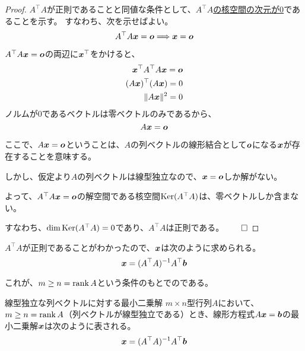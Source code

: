 \documentclass[../../../topic_linear-algebra]{subfiles}
\begin{document}
\begin{proof}
  $A^\top A$が正則であることと同値な条件として、\hyperref[thm:invertibility-by-kernel]{$A^\top A$の核空間の次元が0}であることを示す。
  すなわち、次を示せばよい。
  \begin{equation*}
    A^\top A \vb*{x} = \vb*{o} \Longrightarrow \vb*{x} = \vb*{o}
  \end{equation*}
  
  $A^\top A \vb*{x} = \vb*{o}$の両辺に$\vb*{x}^\top$をかけると、
  \begin{align*}
    \vb*{x}^\top A^\top A \vb*{x} = \vb*{o} \\
    (A \vb*{x})^\top (A \vb*{x}) = 0 \\
    \| A \vb*{x} \|^2 = 0
  \end{align*}
  ノルムが0であるベクトルは零ベクトルのみであるから、
  \begin{equation*}
    A \vb*{x} = \vb*{o}
  \end{equation*}
  
  ここで、$A \vb*{x} = \vb*{o}$ということは、$A$の列ベクトルの線形結合として$\vb*{o}$になる$\vb*{x}$が存在することを意味する。
  
  しかし、仮定より$A$の列ベクトルは線型独立なので、$\vb*{x} = \vb*{o}$しか解がない。
  
  \br
  
  よって、$A^\top A \vb*{x} = \vb*{o}$の解空間である核空間$\operatorname{Ker}(A^\top A)$は、零ベクトルしか含まない。

  すなわち、$\dim \operatorname{Ker}(A^\top A) = 0$であり、$A^\top A$は正則である。$\qed$
\end{proof}

\br

$A^\top A$が正則であることがわかったので、$\vb*{x}$は次のように求められる。
\begin{equation*}
  \vb*{x} = (A^\top A)^{-1}A^\top \vb*{b}
\end{equation*}

これが、$m \geq n = \rank A$という条件のもとでのである。

\begin{theorem}{線型独立な列ベクトルに対する最小二乗解}
  $m \times n$型行列$A$において、$m \geq n = \rank A$（列ベクトルが線型独立である）とき、線形方程式$A\vb*{x} = \vb*{b}$の最小二乗解$\vb*{x}$は次のように表される。
  \begin{equation*}
    \vb*{x} = (A^\top A)^{-1}A^\top \vb*{b}
  \end{equation*}
\end{theorem}
\end{document}
